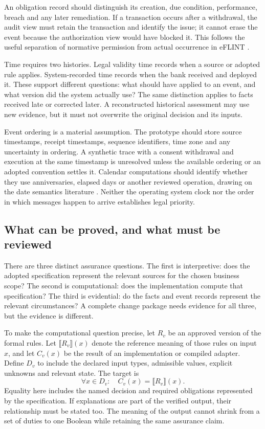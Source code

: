 An obligation record should distinguish its creation, due condition, performance,
breach and any later remediation. If a transaction occurs after a withdrawal, the
audit view must retain the transaction and identify the issue; it cannot erase
the event because the authorization view would have blocked it. This follows the
useful separation of normative permission from actual occurrence in eFLINT
\citep{eflint2026}.

Time requires two histories. Legal validity time records when a source or adopted
rule applies. System-recorded time records when the bank received and deployed
it. These support different questions: what should have applied to an event, and
what version did the system actually use? The same distinction applies to facts
received late or corrected later. A reconstructed historical assessment may use
new evidence, but it must not overwrite the original decision and its inputs.

Event ordering is a material assumption. The prototype should store source
timestamps, receipt timestamps, sequence identifiers, time zone and any uncertainty
in ordering. A synthetic trace with a consent withdrawal and execution at the
same timestamp is unresolved unless the available ordering or an adopted
convention settles it. Calendar computations should identify whether they use
anniversaries, elapsed days or another reviewed operation, drawing on the date
semantics literature \citep{dates2024}. Neither the operating system clock nor the
order in which messages happen to arrive establishes legal priority.



\subsection{What can be proved, and what must be reviewed}
\label{sec:proof}

There are three distinct assurance questions. The first is interpretive: does the
adopted specification represent the relevant sources for the chosen business
scope? The second is computational: does the implementation compute that
specification? The third is evidential: do the facts and event records represent
the relevant circumstances? A complete change package needs evidence for all
three, but the evidence is different.

To make the computational question precise, let $R_v$ be an approved version of
the formal rules. Let $\llbracket R_v\rrbracket(x)$ denote the reference meaning
of those rules on input $x$, and let $C_v(x)$ be the result of an implementation
or compiled adapter. Define $D_v$ to include the declared input types, admissible
values, explicit unknowns and relevant state. The target is
\begin{equation}
 \forall x\in D_v:\quad C_v(x)=\llbracket R_v\rrbracket(x).
 \label{eq:refinement}
\end{equation}
Equality here includes the named decision and required obligations represented by
the specification. If explanations are part of the verified output, their
relationship must be stated too. The meaning of the output cannot shrink from a
set of duties to one Boolean while retaining the same assurance claim.

